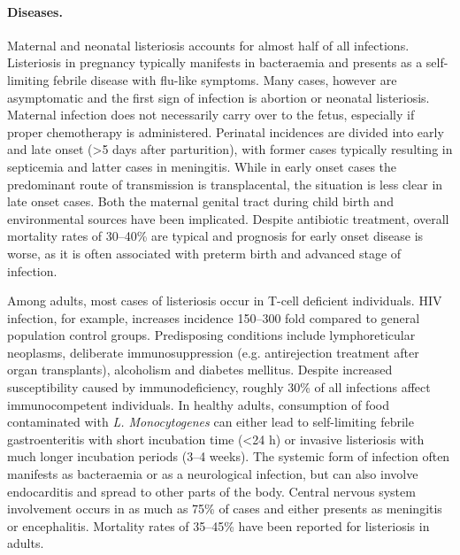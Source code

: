 \paragraph{Diseases.}
Maternal and neonatal listeriosis accounts for almost half of all infections. Listeriosis in pregnancy typically manifests in bacteraemia and presents as a self-limiting febrile disease with flu-like symptoms. Many cases, however are asymptomatic and the first sign of infection is abortion or neonatal listeriosis. Maternal infection does not necessarily carry over to the fetus, especially if proper chemotherapy is administered. Perinatal incidences are divided into early and late onset (\textgreater 5 days after parturition), with former cases typically resulting in septicemia and latter cases in meningitis. While in early onset cases the predominant route of transmission is transplacental, the situation is less clear in late onset cases. Both the maternal genital tract during child birth and environmental sources have been implicated. Despite antibiotic treatment, overall mortality rates of 30--40\% are typical and prognosis for early onset disease is worse, as it is often associated with preterm birth and advanced stage of infection. 

Among adults, most cases of listeriosis occur in T-cell deficient individuals. HIV infection, for example, increases incidence 150--300 fold compared to general population control groups. Predisposing conditions include lymphoreticular neoplasms, deliberate immunosuppression (e.g. antirejection treatment after organ transplants), alcoholism and diabetes mellitus. Despite increased susceptibility caused by immunodeficiency, roughly 30\% of all infections affect immunocompetent individuals. In healthy adults, consumption of food contaminated with \textit{L. Monocytogenes} can either lead to self-limiting febrile gastroenteritis with short incubation time (\textless 24 h) or invasive listeriosis with much longer incubation periods (3--4 weeks). The systemic form of infection often manifests as bacteraemia or as a neurological infection, but can also involve endocarditis and spread to other parts of the body. Central nervous system involvement occurs in as much as 75\% of cases and either presents as meningitis or encephalitis. Mortality rates of 35--45\%  have been reported for listeriosis in adults.

